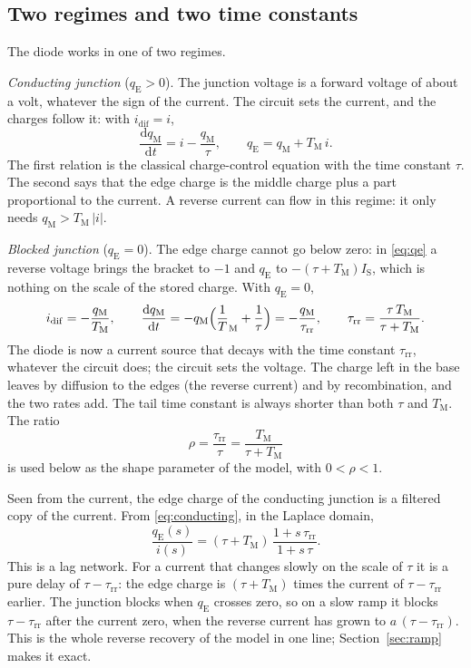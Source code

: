 \documentclass[10pt,a4paper]{scrartcl}
\newcommand{\taurr}{\tau_\mathrm{rr}}
\newcommand{\TM}{T_\mathrm{M}}
\newcommand{\qE}{q_\mathrm{E}}
\newcommand{\qM}{q_\mathrm{M}}
\newcommand{\idif}{i_\mathrm{dif}}
\newcommand{\IS}{I_\mathrm{S}}
\newcommand{\diff}{\mathrm{d}}
\begin{document}
\subsection{Two regimes and two time constants}
\label{sec:regimes}
The diode works in one of two regimes.

\emph{Conducting junction} ($\qE > 0$). The junction voltage is a forward voltage of about a volt, whatever the sign of the current. The circuit sets the current, and the charges follow it: with $\idif = i$,
\begin{equation}
\frac{\diff \qM}{\diff t} = i - \frac{\qM}{\tau} , \qquad \qE = \qM + \TM\, i .
\label{eq:conducting}
\end{equation}
The first relation is the classical charge-control equation with the time constant $\tau$. The second says that the edge charge is the middle charge plus a part proportional to the current. A reverse current can flow in this regime: it only needs $\qM > \TM\,|i|$.

\emph{Blocked junction} ($\qE = 0$). The edge charge cannot go below zero: in \eqref{eq:qe} a reverse voltage brings the bracket to $-1$ and $\qE$ to $-(\tau+\TM)\IS$, which is nothing on the scale of the stored charge. With $\qE = 0$,
\begin{equation}
\idif = -\frac{\qM}{\TM} , \qquad \frac{\diff\qM}{\diff t} = -\qM\Bigl(\frac1\TM + \frac1\tau\Bigr) = -\frac{\qM}{\taurr} , \qquad \taurr = \frac{\tau\,\TM}{\tau+\TM} .
\label{eq:blocked}
\end{equation}
The diode is now a current source that decays with the time constant $\taurr$, whatever the circuit does; the circuit sets the voltage. The charge left in the base leaves by diffusion to the edges (the reverse current) and by recombination, and the two rates add. The tail time constant is always shorter than both $\tau$ and $\TM$. The ratio
\begin{equation}
\rho = \frac{\taurr}{\tau} = \frac{\TM}{\tau+\TM}
\label{eq:rho}
\end{equation}
is used below as the shape parameter of the model, with $0 < \rho < 1$.

Seen from the current, the edge charge of the conducting junction is a filtered copy of the current. From \eqref{eq:conducting}, in the Laplace domain,
\begin{equation}
\frac{\qE(s)}{i(s)} = (\tau+\TM)\,\frac{1+s\,\taurr}{1+s\,\tau} .
\label{eq:filter}
\end{equation}
This is a lag network. For a current that changes slowly on the scale of $\tau$ it is a pure delay of $\tau-\taurr$: the edge charge is $(\tau+\TM)$ times the current of $\tau-\taurr$ earlier. The junction blocks when $\qE$ crosses zero, so on a slow ramp it blocks $\tau-\taurr$ after the current zero, when the reverse current has grown to $a\,(\tau-\taurr)$. This is the whole reverse recovery of the model in one line; Section~\ref{sec:ramp} makes it exact.
\end{document}
